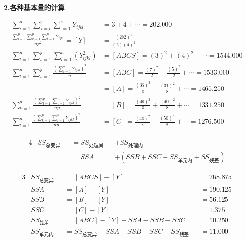 \textbf{2.各种基本量的计算}

\begin{align*}
    \sum\limits_{i=1}^{n}\sum\limits_{k=l}^{p}\sum\limits_{l=1}^{p}Y_{ijkl}&=3+4+\cdots=202.000\\
    \frac{\sum\limits_{l=1}^p{\sum\limits_{k=1}^p{\sum\limits_{i=1}^n{Y_{ijkl}}}}}{np^2}=\left[ Y \right] &=\frac{\left( 202 \right) ^2}{\left( 2 \right) \left( 4 \right) ^2}\\
    \sum\limits_{l=1}^p{\sum\limits_{k=1}^p{\sum\limits_{i=1}^n{\left( Y_{ijkl}^{2} \right)}}}&=\left[ ABCS \right] =\left( 3 \right) ^2+\left( 4 \right) ^2+\cdots =1544.000\\
    \sum\limits_{l=1}^p{\sum\limits_{k=1}^p{\frac{\left( \sum\limits_{i=1}^n{Y_{ijkl}} \right) ^2}{n}}}&=\left[ ABC \right] =\frac{\left( 7 \right) ^2}{2}+\frac{\left( 5 \right) ^2}{2}+\cdots =1533.000\\
     &=\left[ A \right] =\frac{\left( 35 \right) ^2}{8}+\frac{\left( 31 \right) ^2}{8}+\cdots =1465.250\\
    \sum\limits_{k=1}^p{\frac{\left( \sum\limits_{l=1}^p{\sum\limits_{i=1}^n{Y_{ijkl}}} \right) ^2}{np}}&=\left[ B \right] =\frac{\left( 40 \right) ^2}{8}+\frac{\left( 40 \right) ^2}{8}+\cdots =1331.250\\
    \sum\limits_{l=1}^p{\frac{\left( \sum\limits_{k=1}^p{\sum\limits_{i=1}^n{Y_{ijkl}}} \right) ^2}{np}}&=\left[ C \right] =\frac{\left( 48 \right) ^2}{8}+\frac{\left( 50 \right) ^2}{8}+\cdots =1276.500\\
\end{align*}


\begin{alignat*}{4}
   & SS_{\text{总变异}} & &= SS_{\text{处理间}} & & +SS_{\text{处理内}}\\
   &                    & &= SSA               & & +\left( SSB + SSC + SS_{\text{单元内}} + SS_{\text{残差}}  \right)
\end{alignat*}


\begin{alignat*}{3}
    & SS_{\text{总变异}} && =[ABCS]-[Y] && =268.875\\
    & SSA               &&  =[A]   - [Y] && =190.125\\
    &SSB               && =[B] -[Y]&&=56.125\\
    & SSC              && =[C]-[Y] &&= 1.375\\
    & SS_{\text{残差}} && = {[ABC]-[Y]}-SSA-SSB-SSC && =10.250\\
    & SS_{\text{单元内}} && = SS_{\text{总变异}}-SSA-SSB-SSC-SS_{\text{残差}} && = 11.000
\end{alignat*}


